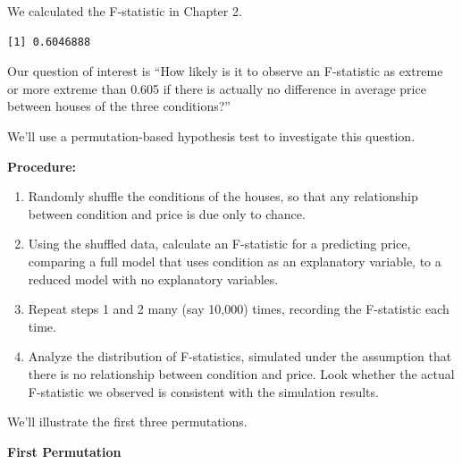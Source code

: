 \documentclass[
  letterpaper,
  DIV=11,
  numbers=noendperiod]{scrreprt}
\newenvironment{Shaded}{\begin{snugshade}}{\end{snugshade}}
\newcommand{\AttributeTok}[1]{\textcolor[rgb]{0.40,0.45,0.13}{#1}}
\newcommand{\DecValTok}[1]{\textcolor[rgb]{0.68,0.00,0.00}{#1}}
\newcommand{\FunctionTok}[1]{\textcolor[rgb]{0.28,0.35,0.67}{#1}}
\newcommand{\NormalTok}[1]{\textcolor[rgb]{0.00,0.23,0.31}{#1}}
\newcommand{\OtherTok}[1]{\textcolor[rgb]{0.00,0.23,0.31}{#1}}
\newcommand{\SpecialCharTok}[1]{\textcolor[rgb]{0.37,0.37,0.37}{#1}}
\begin{document}
We calculated the F-statistic in Chapter 2.

\begin{Shaded}
\end{Shaded}

\begin{verbatim}
[1] 0.6046888
\end{verbatim}

Our question of interest is ``How likely is it to observe an F-statistic
as extreme or more extreme than 0.605 if there is actually no difference
in average price between houses of the three conditions?''

We'll use a permutation-based hypothesis test to investigate this
question.

\textbf{Procedure:}

\begin{enumerate}
\def\labelenumi{\arabic{enumi}.}
\item
  Randomly shuffle the conditions of the houses, so that any
  relationship between condition and price is due only to chance.
\item
  Using the shuffled data, calculate an F-statistic for a predicting
  price, comparing a full model that uses condition as an explanatory
  variable, to a reduced model with no explanatory variables.
\item
  Repeat steps 1 and 2 many (say 10,000) times, recording the
  F-statistic each time.
\item
  Analyze the distribution of F-statistics, simulated under the
  assumption that there is no relationship between condition and price.
  Look whether the actual F-statistic we observed is consistent with the
  simulation results.
\end{enumerate}

We'll illustrate the first three permutations.

\textbf{First Permutation}
\end{document}
